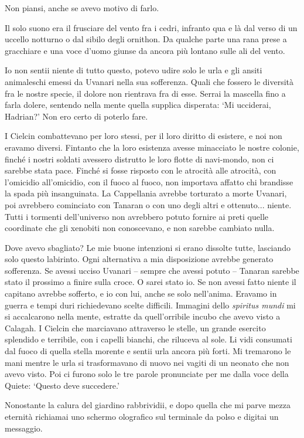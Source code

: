 Non piansi, anche se avevo motivo di farlo.

Il solo suono era il frusciare del vento fra i cedri, infranto qua e là
dal verso di un uccello notturno o dal sibilo degli ornithon. Da qualche
parte una rana prese a gracchiare e una voce d'uomo giunse da ancora più
lontano sulle ali del vento.

Io non sentii niente di tutto questo, potevo udire solo le urla e gli
ansiti animaleschi emessi da Uvanari nella sua sofferenza. Quali che
fossero le diversità fra le nostre specie, il dolore non rientrava fra
di esse. Serrai la mascella fino a farla dolere, sentendo nella mente
quella supplica disperata: `Mi ucciderai, Hadrian?' Non ero certo di
poterlo fare.

I Cielcin combattevano per loro stessi, per il loro diritto di esistere,
e noi non eravamo diversi. Fintanto che la loro esistenza avesse
minacciato le nostre colonie, finché i nostri soldati avessero distrutto
le loro flotte di navi-mondo, non ci sarebbe stata pace. Finché si fosse
risposto con le atrocità alle atrocità, con l'omicidio all'omicidio, con
il fuoco al fuoco, non importava affatto chi brandisse la spada più
insanguinata. La Cappellania avrebbe torturato a morte Uvanari, poi
avrebbero cominciato con Tanaran o con uno degli altri e ottenuto...
niente. Tutti i tormenti dell'universo non {avrebbero} potuto fornire ai
preti quelle coordinate che gli xenobiti non conoscevano, e non sarebbe
cambiato nulla.

Dove avevo sbagliato? Le mie buone intenzioni si erano dissolte tutte,
lasciando solo questo labirinto. Ogni alternativa a mia disposizione
avrebbe generato sofferenza. Se avessi ucciso Uvanari -- sempre che
avessi potuto -- Tanaran sarebbe stato il prossimo a finire sulla croce.
O sarei stato io. Se non avessi fatto niente il capitano avrebbe
sofferto, e io con lui, anche se solo nell'anima. Eravamo in guerra e
tempi duri richiedevano scelte difficili. Immagini dello \emph{spiritus
	mundi} mi si accalcarono nella mente, estratte da quell'orribile incubo
che avevo visto a Calagah. I Cielcin che marciavano attraverso le
stelle, un grande esercito splendido e terribile, con i capelli bianchi,
che riluceva al sole. Li vidi consumati dal fuoco di quella stella
morente e sentii urla ancora più forti. Mi tremarono le mani mentre le
urla si trasformavano di nuovo nei vagiti di un neonato che non avevo
visto. Poi ci furono solo le tre parole pronunciate per me dalla voce
della Quiete: `Questo deve succedere.'

Nonostante la calura del giardino rabbrividii, e dopo quella che mi
parve mezza eternità richiamai uno schermo olografico sul terminale da
polso e digitai un messaggio.

